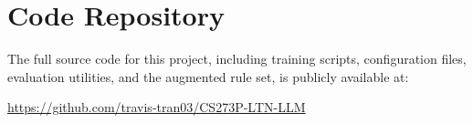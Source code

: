 \documentclass[11pt,a4paper]{article}
\begin{document}
\appendix
\section{Code Repository}

The full source code for this project, including training scripts,
configuration files, evaluation utilities, and the augmented rule set,
is publicly available at:

\begin{center}
\url{https://github.com/travis-tran03/CS273P-LTN-LLM}
\end{center}
\end{document}
